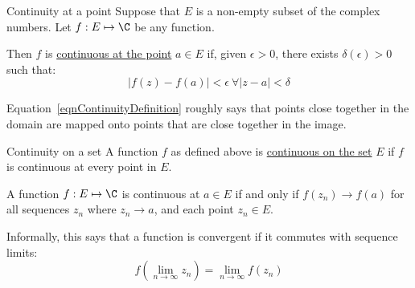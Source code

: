 \documentclass[../Main.tex]{subfiles}
\begin{document}
\begin{definition}{Continuity at a point}
    Suppose that $E$ is a non-empty subset of the complex numbers. Let $f: E \mapsto \C$ be any function.\par
    Then $f$ is \underline{continuous at the point} $a \in E$ if, given $\epsilon > 0$, there exists $\delta(\epsilon) > 0$ such that:
    \begin{equation}
        |f(z) - f(a)| < \epsilon~\forall |z - a| < \delta
        \label{eqnContinuityDefinition}
    \end{equation}
\end{definition}
Equation~\ref{eqnContinuityDefinition} roughly says that points close together in the domain are mapped onto points that are close together in the image.
\begin{definition}{Continuity on a set}
    A function $f$ as defined above is \underline{continuous on the set} $E$ if $f$ is continuous at every point in $E$.
\end{definition}
\begin{theorem}
    A function $f : E \mapsto \C$ is continuous at $a \in E$ if and only if $f(z_n) \to f(a)$ for all sequences $z_n$ where $z_n \to a$, and each point $z_n \in E$.
    \label{thmContinuitySequenceDef}
\end{theorem}
Informally, this says that a function is convergent if it commutes with sequence limits:
\begin{equation}
    f(\lim_{n \to \infty}z_n) = \lim_{n \to \infty}f(z_n)
    \label{eqnLimitCommutativity}
\end{equation}
\end{document}
